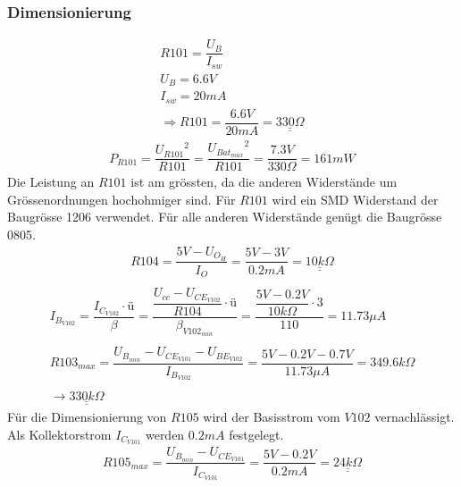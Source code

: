 \subsubsection{Dimensionierung}
\[ \begin{array}{l}
R101 = \dfrac{U_B}{I_{sw}}\\
U_B = 6.6 V\\
I_{sw} = 20 mA\\
\Rightarrow R101 = \dfrac{6.6V}{20mA} = \underline{\underline{330 \Omega}}
\end{array} \]
\[ \begin{array}{l}
P_{R101} = \dfrac{{U_{R101}}^2}{R101} = \dfrac{{U_{Bat_{max}}}^2}{R101} 
= \dfrac{7.3 V}{330 \Omega} = 161 mW
\end{array} \]
Die Leistung an $R101$ ist am grössten, da die anderen Widerstände um 
Grössenordnungen hochohmiger sind. Für $R101$ wird ein SMD Widerstand der 
Baugrösse 1206 verwendet. Für alle anderen Widerstände genügt die Baugrösse 
0805. 
%
\[ \begin{array}{l}
R104 = \dfrac{5 V - U_{O_H}}{I_O} = \dfrac{5 V - 3 V}{0.2 mA} 
= \underline{\underline{10 k \Omega}}\\
\end{array} \]
%
\[ \begin{array}{l}
I_{B_{V102}} 
= \dfrac{I_{C_{V102}} \cdot ü}{\beta} 
= \dfrac{\dfrac{U_{cc} - U_{CE_{V102}}}{R104} \cdot ü}{\beta_{V102_{min}}} 
= \dfrac{\dfrac{5V - 0.2V}{10 k\Omega} \cdot 3}{110} = 11.73 \mu A\\\\
R103_{max} 
= \dfrac{U_{B_{min}} - U_{CE_{V101}} - U_{BE_{V102}}}{I_{B_{V102}}} 
= \dfrac{5 V - 0.2 V - 0.7 V}{11.73 \mu A} 
= 349.6 k \Omega\\\\
\rightarrow \underline{\underline{330 k\Omega}}
\end{array} \]
%
Für die Dimensionierung von $R105$ wird der Basisstrom vom $V102$ 
vernachlässigt. Als Kollektorstrom $I_{C_{V101}}$ werden $0.2 mA$ festgelegt. 
\[ \begin{array}{l}
R105_{max} 
= \dfrac{U_{B_{min}} - U_{CE_{V101}}}{I_{C_{V101}}} 
= \dfrac{5 V - 0.2 V}{0.2 mA} = \underline{\underline{24 k \Omega}}\\
\end{array} \]
%
